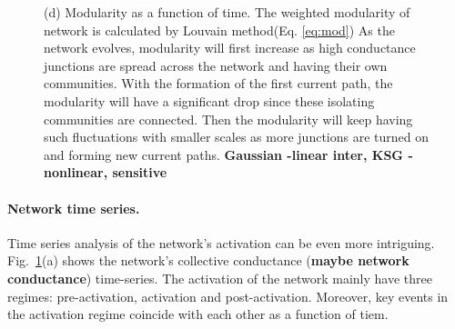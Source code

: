 \documentclass[fleqn,10pt,  reprint, amsmath,amssymb,aps, floatfix]{wlscirep}
\begin{document}
\begin{figure}
{			\newline (d) Modularity as a function of time. The weighted modularity of network is calculated by Louvain method(Eq. \ref{eq:mod}) As the network evolves, modularity will first increase as high conductance junctions are spread across the network and having their own communities. With the formation of the first current path, the modularity will have a significant drop since these isolating communities are connected. Then the modularity will keep having such fluctuations with smaller scales as more junctions are turned on and forming new current paths.
			\textbf{Gaussian -linear inter, KSG - nonlinear, sensitive}}
	
	\label{fig:time_series}
\end{figure}

\paragraph{Network time series.}

Time series analysis of the network's activation can be even more intriguing. Fig.~\ref{fig:time_series}(a) shows the network's collective conductance (\textbf{maybe network conductance}) time-series. The activation of the network mainly have three regimes: pre-activation, activation and post-activation. Moreover, key events in the activation regime coincide with each other as a function of tiem.
\end{document}

